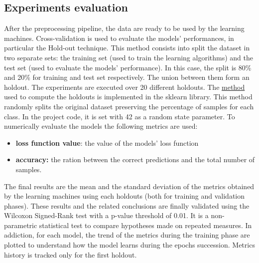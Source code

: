 \subsection{Experiments evaluation}\label{header-n82}

After the preprocessing pipeline, the data are ready to be used by the
learning machines. Cross-validation is used to evaluate the models'
performances, in particular the Hold-out technique. This method consists
into split the dataset in two separate sets: the training set (used to
train the learning algorithms) and the test set (used to evaluate the
models' performance). In this case, the split is 80\% and 20\% for
training and test set respectively. The union between them form an holdout. The
experiments are executed over 20 different holdouts. The
\href{https://scikit-learn.org/stable/modules/generated/sklearn.model_selection.StratifiedShuffleSplit.html}{method}
used to compute the holdouts is implemented in the sklearn library. This
method randomly splits the original dataset preserving
the percentage of samples for each class. In the project code, it is set with 42 as a random
state parameter. To numerically evaluate the models the following
metrics are used:

\begin{itemize}
\item
  \textbf{loss function value}: the value of the models' loss function
\item
  \textbf{accuracy:} the ration between the correct predictions and the
  total number of samples.
\end{itemize}

The final results are the mean and the standard deviation of the metrics
obtained by the learning machines using each holdouts (both for training
and validation phases). These results and the related conclusions are
finally validated using the Wilcoxon Signed-Rank test with a p-value
threshold of 0.01. It is a non-parametric statistical test to compare
hypotheses made on repeated measures. In addiction, for each model, the
trend of the metrics during the training phase are plotted to understand
how the model learns during the epochs succession. Metrics history is tracked only for the first holdout.